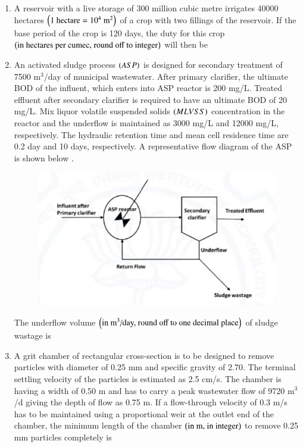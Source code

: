 \documentclass[journal,12pt,onecolumn]{article}
\theoremstyle{remark}
\begin{document}
\begin{enumerate}
\hfill{}

\item A reservoir with a live storage of 300 million cubic metre irrigates 40000 hectares $\left(\text{1 hectare} = 10^4 \text{ m}^2\right)$ of a crop with two fillings of the reservoir. If the base period of the crop is 120 days, 
the duty for this crop \\
$\left(\text{in hectares per cumec, round off to integer}\right)$ will then be \underline{\hspace{2cm}}

\hfill{}

\item An activated sludge process $\left(ASP\right)$ is designed for secondary treatment of 7500 m$^3$/day of municipal wastewater. After primary clarifier, the ultimate BOD of the influent, which enters into ASP reactor is 200 mg/L. Treated effluent after secondary clarifier is required to have an ultimate BOD of 20 mg/L. Mix liquor volatile suspended solids $\left(MLVSS\right)$ concentration in the reactor and the underflow is maintained as 3000 mg/L and 12000 mg/L, respectively. The hydraulic retention time and mean cell residence time are 0.2 day and 10 days, respectively. A representative flow diagram of the ASP is shown below .
\begin{figure}[H]
    \centering
    \includegraphics[width=0.7\columnwidth]{figs/2q51.jpg}
    \caption{}
    \label{fig:q51}
\end{figure}
The underflow volume $\left(\text{in m}^3\text{/day, round off to one decimal place}\right)$ of sludge wastage is \underline{\hspace{2cm}}

\hfill{}

\item A grit chamber of rectangular cross-section is to be designed to remove particles with diameter of 0.25 mm and specific gravity of 2.70. The terminal settling velocity of the particles is estimated as 2.5 cm/s. The chamber is having a width of 0.50 m and has to carry a peak wastewater flow of 9720 m$^3$/d giving the depth of flow as 0.75 m. If a flow-through velocity of 0.3 m/s has to be maintained using a proportional weir at the outlet end of the chamber, the minimum length of the chamber $\left(\text{in m, in integer}\right)$ to remove 0.25 mm particles completely is \underline{\hspace{2cm}}


\end{enumerate}
\end{document}
